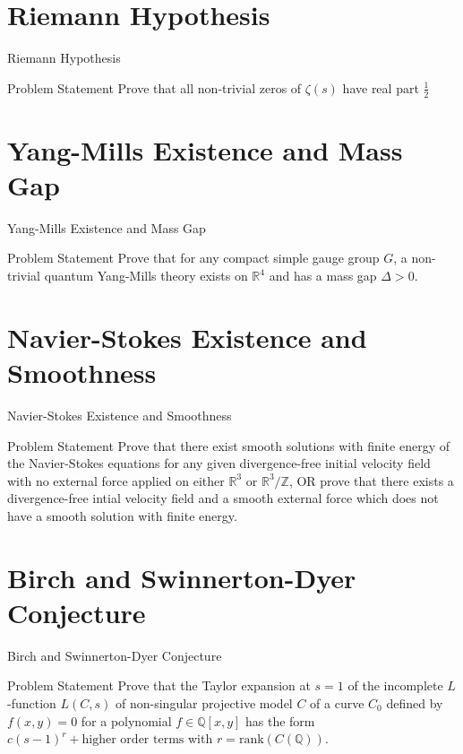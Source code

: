 \documentclass[handout]{beamer}
\newcommand{\Real}{\mathbb{R}}
\newcommand{\Rational}{\mathbb{Q}}
\newcommand{\Integer}{\mathbb{Z}}
\begin{document}
  \section{Riemann Hypothesis}
  \begin{frame}{Riemann Hypothesis}
      \begin{block}{Problem Statement}
          Prove that all non-trivial zeros of $\zeta(s)$ have real part
          $\frac{1}{2}$
      \end{block}
  \end{frame}

  \section{Yang-Mills Existence and Mass Gap}
  \begin{frame}{Yang-Mills Existence and Mass Gap}
      \begin{block}{Problem Statement}
          Prove that for any compact simple gauge group $G$, a non-trivial
          quantum Yang-Mills theory exists on $\Real^4$ and has a mass gap
          $\Delta > 0$.
      \end{block}
  \end{frame}

  \section{Navier-Stokes Existence and Smoothness}
  \begin{frame}{Navier-Stokes Existence and Smoothness}
      \begin{block}{Problem Statement}
          Prove that there exist smooth solutions with finite energy of the
          Navier-Stokes equations for any given divergence-free initial
          velocity field with no external force applied on either $\Real^3$
          or $\Real^3/\Integer$, OR prove that there exists a divergence-free
          intial velocity field and a smooth external force which does not
          have a smooth solution with finite energy.
      \end{block}
  \end{frame}

  \section{Birch and Swinnerton-Dyer Conjecture}
  \begin{frame}{Birch and Swinnerton-Dyer Conjecture}
      \begin{block}{Problem Statement}
          Prove that the Taylor expansion at $s=1$ of the incomplete
          $L$-function $L(C, s)$ of non-singular projective model $C$ of a
          curve $C_0$ defined by $f(x, y) = 0$ for a polynomial
          $f \in \Rational [x, y]$ has the form
          $c(s-1)^r + \text{higher order terms}$ with
          $r = \mathrm{rank}(C(\Rational))$.
      \end{block}
  \end{frame}
\end{document}
